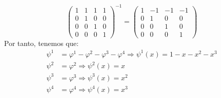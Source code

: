 \begin{ejercicio}
\begin{itemize}
\begin{equation*}
\begin{pmatrix}
					1 & 1 & 1 & 1 \\
					0 & 1 & 0 & 0 \\
					0 & 0 & 1 & 0 \\
					0 & 0 & 0 & 1
				\end{pmatrix}^{-1} = \begin{pmatrix}
					1 & -1 & -1 & -1 \\
					0 & 1  & 0  & 0  \\
					0 & 0  & 1  & 0  \\
					0 & 0  & 0  & 1
				\end{pmatrix}
			\end{equation*}
			Por tanto, tenemos que:
			\begin{align*}
				\psi^1 & = \varphi^1 - \varphi^2 - \varphi^3 - \varphi^4 \Rightarrow \psi^1(x) = 1 - x - x^2 - x^3 \\
				\psi^2 & = \varphi^2 \Rightarrow \psi^2(x) = x                                                     \\
				\psi^3 & = \varphi^3 \Rightarrow \psi^3(x) = x^2                                                   \\
				\psi^4 & = \varphi^4 \Rightarrow \psi^4(x) = x^3
			\end{align*}
	\end{itemize}
\end{ejercicio}


